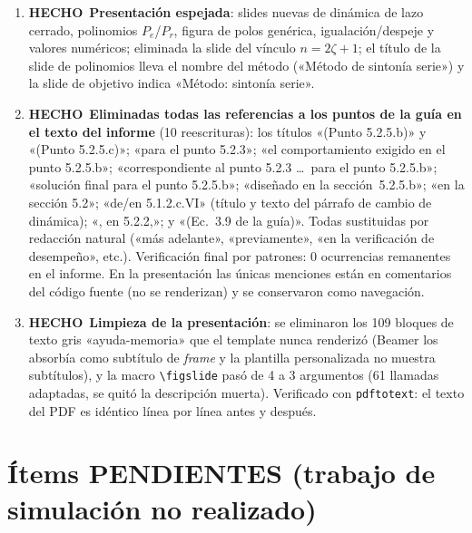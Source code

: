 \documentclass[11pt,a4paper]{article}
\newcommand{\hecho}{\textcolor{okgreen}{\textbf{HECHO}}}
\begin{document}
\begin{enumerate}[label=\textbf{P\arabic*.}, leftmargin=1.3cm]
  \item \hecho\ \textbf{Presentación espejada}: slides nuevas de dinámica de lazo cerrado, polinomios $P_e$/$P_r$, figura de polos genérica, igualación/despeje y valores numéricos; eliminada la slide del vínculo $n=2\zeta+1$; el título de la slide de polinomios lleva el nombre del método («Método de sintonía serie») y la slide de objetivo indica «Método: sintonía serie».
  \item \hecho\ \textbf{Eliminadas todas las referencias a los puntos de la guía en el texto del informe} (10 reescrituras): los títulos «(Punto 5.2.5.b)» y «(Punto 5.2.5.c)»; «para el punto 5.2.3»; «el comportamiento exigido en el punto 5.2.5.b»; «correspondiente al punto 5.2.3 \dots\ para el punto 5.2.5.b»; «solución final para el punto 5.2.5.b»; «diseñado en la sección~5.2.5.b»; «en la sección 5.2»; «de/en 5.1.2.c.VI» (título y texto del párrafo de cambio de dinámica); «, en 5.2.2,»; y «(Ec.~3.9 de la guía)». Todas sustituidas por redacción natural («más adelante», «previamente», «en la verificación de desempeño», etc.). Verificación final por patrones: 0 ocurrencias remanentes en el informe. En la presentación las únicas menciones están en comentarios del código fuente (no se renderizan) y se conservaron como navegación.
  \item \hecho\ \textbf{Limpieza de la presentación}: se eliminaron los 109 bloques de texto gris «ayuda-memoria» que el template nunca renderizó (Beamer los absorbía como subtítulo de \emph{frame} y la plantilla personalizada no muestra subtítulos), y la macro \texttt{\textbackslash figslide} pasó de 4 a 3 argumentos (61 llamadas adaptadas, se quitó la descripción muerta). Verificado con \texttt{pdftotext}: el texto del PDF es idéntico línea por línea antes y después.
\end{enumerate}

\section{Ítems PENDIENTES (trabajo de simulación no realizado)}
\end{document}
